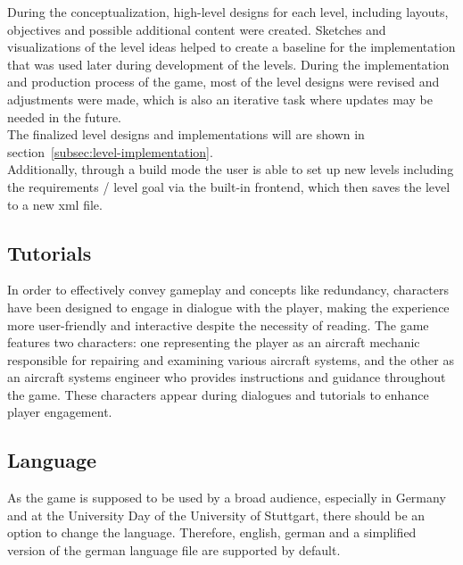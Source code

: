 During the conceptualization, high-level designs for each level, including layouts, objectives and possible additional content were created.
Sketches and visualizations of the level ideas helped to create a baseline for the implementation that was used later during development of the levels.
During the implementation and production process of the game, most of the level designs were revised and adjustments were made, which is also
an iterative task where updates may be needed in the future.
\\
The finalized level designs and implementations will are shown in section~\ref{subsec:level-implementation}.
\\
Additionally, through a build mode the user is able to set up new levels including the requirements / level goal via the built-in
frontend, which then saves the level to a new xml file.

\subsection{Tutorials}\label{subsec:tutorials}
In order to effectively convey gameplay and concepts like redundancy, characters have been designed to engage in dialogue with the player,
making the experience more user-friendly and interactive despite the necessity of reading.
The game features two characters: one representing the player as an aircraft mechanic responsible for repairing
and examining various aircraft systems, and the other as an aircraft systems engineer who provides instructions and guidance throughout the game.
These characters appear during dialogues and tutorials to enhance player engagement.

\subsection{Language}\label{subsec:language}
As the game is supposed to be used by a broad audience, especially in Germany and at the University Day of the University of Stuttgart, there should be an option
to change the language.
Therefore, english, german and a simplified version of the german language file are supported by default.